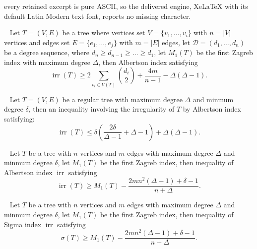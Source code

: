 \documentclass[10pt,a4paper]{amsart}
\newcommand{\irr}{\operatorname{irr}}
\begin{document}
every retained excerpt is pure ASCII, so the delivered engine, XeLaTeX with its default Latin Modern text font, reports no missing character.
\begin{proposition}~\label{prozagn2}
Let $T=(V,E)$ be a tree where vertices set $V=\{v_1,\dots,v_i\}$ with $n=|V|$ vertices and edges set $E=\{e_1,\dots,e_j\}$ with $m=|E|$ edges, let $\mathscr{D}=(d_1,\dots,d_n)$ be a degree sequence, where $d_n\geqslant d_{n-1}\geqslant \dots \geqslant d_1$, let $M_1(T)$ be the first Zagreb index with maximum degree $\Delta$, then Albertson index satisfying 
\[\irr(T)\geqslant 2\sum_{v_i\in V(T)}\binom{d_i}{2}+\frac{4m}{n-1}-\Delta(\Delta-1).\]
\end{proposition}

\begin{theorem}~\label{mainalb4}
Let $T=(V,E)$ be a regular tree with maximum degree $\Delta$ and minmum  degree $\delta$, then  an inequality involving the irregularity of $T$ by Albertson index satisfying: 
    \[
    \irr(T) \leq \delta \left( \frac{2\delta}{\Delta - 1} + \Delta - 1 \right) + \Delta (\Delta - 1).
    \]
\end{theorem}

\begin{theorem}~\label{thmalbn1}
Let $T$ be a tree with $n$ vertices and $m$ edges with maximum degree $\Delta$ and minmum  degree $\delta$, let $M_1(T)$ be the first Zagreb index, then inequality of Albertson index $\irr$ satisfying 
\[
\irr(T) \geq M_1(T)  - \frac{2mn^2(\Delta - 1)+\delta-1}{n+\Delta}.
\]
\end{theorem}

\begin{theorem}~\label{thmsign1}
Let $T$ be a tree with $n$ vertices and $m$ edges with maximum degree $\Delta$ and minmum  degree $\delta$, let $M_1(T)$ be the first Zagreb index, then inequality of Sigma index $\irr$ satisfying 
\[
\sigma(T) \geq M_1(T)  - \frac{2mn^2(\Delta - 1)+\delta-1}{n+\Delta}.
\]
\end{theorem}
\end{document}
